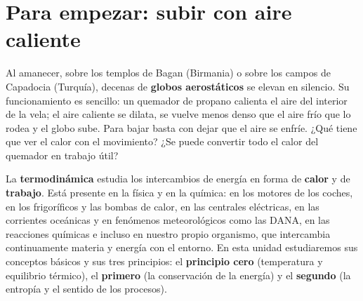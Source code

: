 
\section*{Para empezar: subir con aire caliente}

Al amanecer, sobre los templos de Bagan (Birmania) o sobre los campos de Capadocia (Turquía), decenas de \textbf{globos
aerostáticos} se elevan en silencio. Su funcionamiento es sencillo: un quemador de propano calienta el aire del interior de la
vela; el aire caliente se dilata, se vuelve menos denso que el aire frío que lo rodea y el globo sube. Para bajar basta con dejar
que el aire se enfríe. ¿Qué tiene que ver el calor con el movimiento? ¿Se puede convertir todo el calor del quemador en trabajo
útil?

La \textbf{termodinámica} estudia los intercambios de energía en forma de \textbf{calor} y de \textbf{trabajo}. Está presente en la
física y en la química: en los motores de los coches, en los frigoríficos y las bombas de calor, en las centrales eléctricas, en
las corrientes oceánicas y en fenómenos meteorológicos como las DANA, en las reacciones químicas e incluso en nuestro propio
organismo, que intercambia continuamente materia y energía con el entorno. En esta unidad estudiaremos sus conceptos básicos y sus
tres principios: el \textbf{principio cero} (temperatura y equilibrio térmico), el \textbf{primero} (la conservación de la energía)
y el \textbf{segundo} (la entropía y el sentido de los procesos).

